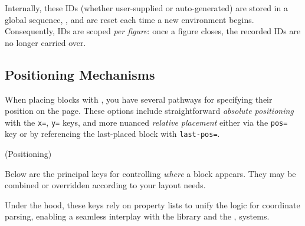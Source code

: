 \documentclass[show-experimental]{l3doc}
\begin{document}
\begin{texnote}
	Internally, these IDs (whether user-supplied or auto-generated) are stored
	in a global sequence, , and are reset each
	time a new  environment begins. Consequently, IDs are
	scoped \emph{per figure}: once a figure closes, the recorded IDs are no longer
	carried over.
\end{texnote}

\begin{nskexample}[sidebyside, righthand width=6cm]
	\begin{nskFigure}[center]
		\nskContainer[
			text-north={Auto-generated ID},
		]{
			\nskBlock[
				text-center={\nskBlockID},
			]
			\nskBlock[
				pos={right=1cm of rectangle1},
				text-center={\nskBlockID},
			]
		}
		\nskContainer[
			text-north={Manual ID},
			shift-y={4.5cm}
		]{
			\nskBlock[
				id=ablock,
				x=0, y=0,
				text-center={\nskBlockID},
			]
			\nskBlock[
				id=bblock,
				y=0,
				pos={right=1cm of ablock},
				text-center={\nskBlockID},
			]
		}
	\end{nskFigure}
\end{nskexample}

\subsection{Positioning Mechanisms{}}

When placing blocks with , you have several pathways for specifying their position on the page. These options include straightforward \emph{absolute positioning} with the \verb|x=|, \verb|y=| keys, and more nuanced \emph{relative placement} either via the \verb|pos=| key or by referencing the last-placed block with \verb|last-pos=|.

\begin{function}{\nskBlock (Positioning)}
	\begin{syntax}
		 
	\end{syntax}
	Below are the principal keys for controlling \emph{where} a block appears. They may be combined or overridden according to your layout needs.

	\begin{texnote}
		Under the hood, these keys rely on  property lists to unify
		the logic for coordinate parsing, enabling a seamless interplay
		with the   library and the
		,  systems.
	\end{texnote}
\end{function}
\end{document}

